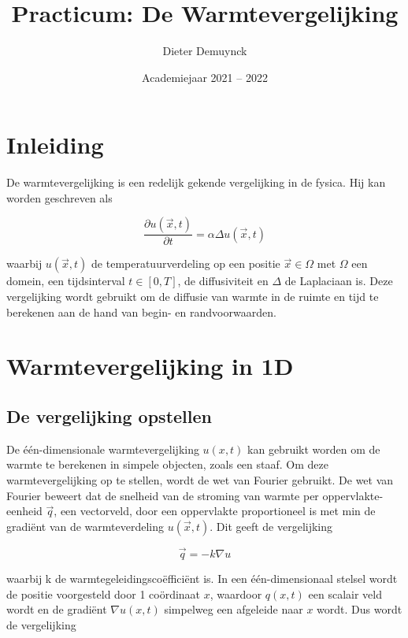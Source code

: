 \documentclass[a4paper,kulak]{kulakarticle} %
\date{Academiejaar 2021 -- 2022}
\title{Practicum: De Warmtevergelijking}
\author{Dieter Demuynck}
\begin{document}
\maketitle

\section*{Inleiding}

De warmtevergelijking is een redelijk gekende vergelijking in de fysica. Hij kan worden geschreven als

\begin{equation}
	\frac{\partial u(\vec{x}, t)}{\partial t} = \alpha \Delta u(\vec{x}, t)
\end{equation}

waarbij $u(\vec{x}, t)$ de temperatuurverdeling op een positie $\vec{x} \in \Omega$ met $\Omega$ een domein, een tijdsinterval $t \in [0, T]$, de diffusiviteit en $\Delta$ de Laplaciaan is. Deze vergelijking wordt gebruikt om de diffusie van warmte in de ruimte en tijd te berekenen aan de hand van begin- en randvoorwaarden.  %

\section{Warmtevergelijking in 1D}

\subsection{De vergelijking opstellen}
De één-dimensionale warmtevergelijking $u(x, t)$ kan gebruikt worden om de warmte te berekenen in simpele objecten, zoals een staaf. Om deze warmtevergelijking op te stellen, wordt de wet van Fourier gebruikt. %
De wet van Fourier beweert dat de snelheid van de stroming van warmte per oppervlakte-eenheid $\vec{q}$, een vectorveld, door een oppervlakte proportioneel is met min de gradiënt van de warmteverdeling $u(\vec{x}, t)$. Dit geeft de vergelijking

\begin{equation}
	\vec{q} = - k \nabla u
\end{equation}

waarbij k de warmtegeleidingscoëfficiënt is.
In een één-dimensionaal stelsel wordt de positie voorgesteld door 1 coördinaat $x$, waardoor $q(x, t)$ een scalair veld wordt en de gradiënt $\nabla u (x, t)$ simpelweg een afgeleide naar $x$ wordt. Dus  wordt de vergelijking
\end{document}
